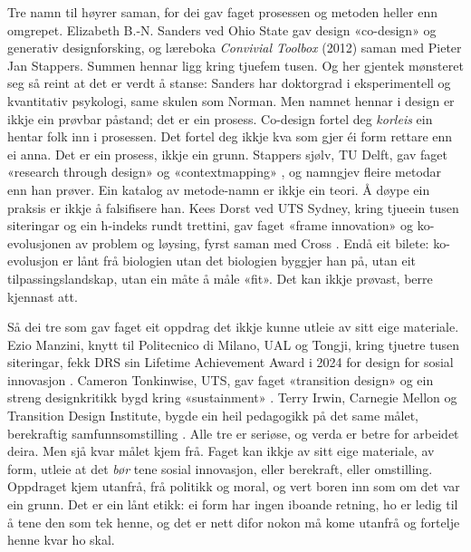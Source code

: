 Tre namn til høyrer saman, for dei gav faget prosessen og metoden heller enn omgrepet. Elizabeth B.-N. Sanders ved Ohio State gav design «co-design» og generativ designforsking, og læreboka \textit{Convivial Toolbox} (2012) saman med Pieter Jan Stappers. Summen hennar ligg kring tjuefem tusen. Og her gjentek mønsteret seg så reint at det er verdt å stanse: Sanders har doktorgrad i eksperimentell og kvantitativ psykologi, same skulen som Norman. Men namnet hennar i design er ikkje ein prøvbar påstand; det er ein prosess. Co-design fortel deg \emph{korleis} ein hentar folk inn i prosessen. Det fortel deg ikkje kva som gjer éi form rettare enn ei anna. Det er ein prosess, ikkje ein grunn. Stappers sjølv, TU Delft, gav faget «research through design» og «contextmapping» \autocite{stappers2017rtd}, og namngjev fleire metodar enn han prøver. Ein katalog av metode-namn er ikkje ein teori. Å døype ein praksis er ikkje å falsifisere han. Kees Dorst ved UTS Sydney, kring tjueein tusen siteringar og ein h-indeks rundt trettini, gav faget «frame innovation» og ko-evolusjonen av problem og løysing, fyrst saman med Cross \autocite{cross2001discipline,dorst2011core,dorst2015frame}. Endå eit bilete: ko-evolusjon er lånt frå biologien utan det biologien byggjer han på, utan eit tilpassingslandskap, utan ein måte å måle «fit». Det kan ikkje prøvast, berre kjennast att.

Så dei tre som gav faget eit oppdrag det ikkje kunne utleie av sitt eige materiale. Ezio Manzini, knytt til Politecnico di Milano, UAL og Tongji, kring tjuetre tusen siteringar, fekk DRS sin Lifetime Achievement Award i 2024 for design for sosial innovasjon \autocite{manzini2015}. Cameron Tonkinwise, UTS, gav faget «transition design» og ein streng designkritikk bygd kring «sustainment» \autocite{tonkinwise2011,tonkinwise2017just}. Terry Irwin, Carnegie Mellon og Transition Design Institute, bygde ein heil pedagogikk på det same målet, berekraftig samfunnsomstilling \autocite{irwin2015transition}. Alle tre er seriøse, og verda er betre for arbeidet deira. Men sjå kvar målet kjem frå. Faget kan ikkje av sitt eige materiale, av form, utleie at det \emph{bør} tene sosial innovasjon, eller berekraft, eller omstilling. Oppdraget kjem utanfrå, frå politikk og moral, og vert boren inn som om det var ein grunn. Det er ein lånt etikk: ei form har ingen iboande retning, ho er ledig til å tene den som tek henne, og det er nett difor nokon må kome utanfrå og fortelje henne kvar ho skal.

